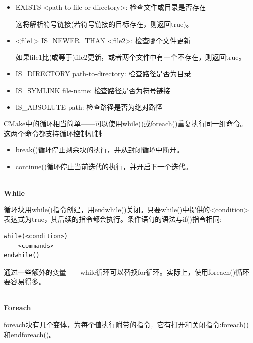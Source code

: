 \begin{itemize}
\item 
EXISTS <path-to-file-or-directory>: 检查文件或目录是否存在

这将解析符号链接(若符号链接的目标存在，则返回true)。

\item 
<file1> IS\_NEWER\_THAN <file2>: 检查哪个文件更新

如果file1比(或等于)file2更新，或者两个文件中有一个不存在，则返回true。

\item 
IS\_DIRECTORY path-to-directory: 检查路径是否为目录

\item 
IS\_SYMLINK file-name: 检查路径是否为符号链接

\item 
IS\_ABSOLUTE path: 检查路径是否为绝对路径
\end{itemize}


CMake中的循环相当简单——可以使用while()或foreach()重复执行同一组命令。这两个命令都支持循环控制机制:

\begin{itemize}
\item 
break()循环停止剩余块的执行，并从封闭循环中断开。

\item 
continue()循环停止当前迭代的执行，并开启下一个迭代。
\end{itemize}

\hspace*{\fill} \\ %
\noindent
\textbf{While}

循环块用while()指令创建，用endwhile()关闭。只要while()中提供的<condition>表达式为true，其后续的指令都会执行。条件语句的语法与if()指令相同:

\begin{lstlisting}[style=styleCMake]
while(<condition>)
	<commands>
endwhile()
\end{lstlisting}

通过一些额外的变量——while循环可以替换for循环。实际上，使用foreach()循环要容易得多。

\hspace*{\fill} \\ %
\noindent
\textbf{Foreach}

foreach块有几个变体，为每个值执行附带的指令，它有打开和关闭指令:foreach()和endforeach()。

